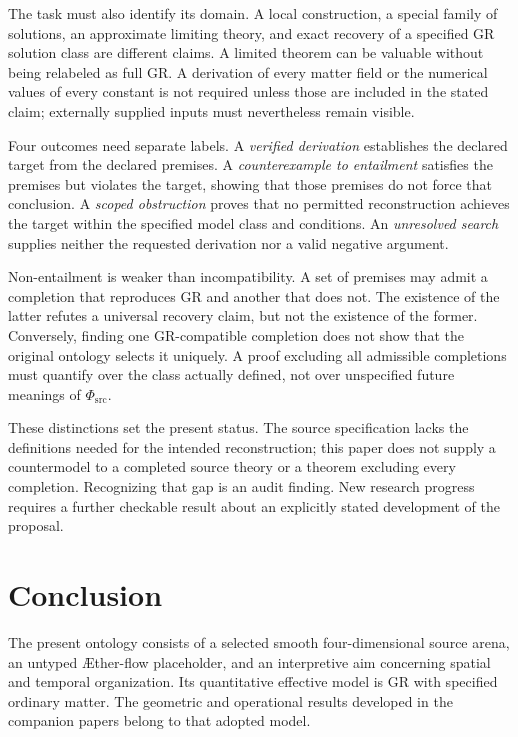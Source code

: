 \documentclass[11pt,oneside]{report}
\newcommand{\Aflow}{\AE{}ther-flow}
\newcommand{\PhiSrc}{\Phi_{\mathrm{src}}}
\theoremstyle{remark}
\numberwithin{definition}{chapter}
\numberwithin{proposition}{chapter}
\numberwithin{remark}{chapter}
\begin{document}
The task must also identify its domain. A local construction, a special family of solutions, an approximate limiting theory, and exact recovery of a specified GR solution class are different claims. A limited theorem can be valuable without being relabeled as full GR. A derivation of every matter field or the numerical values of every constant is not required unless those are included in the stated claim; externally supplied inputs must nevertheless remain visible.

Four outcomes need separate labels. A \emph{verified derivation} establishes the declared target from the declared premises. A \emph{counterexample to entailment} satisfies the premises but violates the target, showing that those premises do not force that conclusion. A \emph{scoped obstruction} proves that no permitted reconstruction achieves the target within the specified model class and conditions. An \emph{unresolved search} supplies neither the requested derivation nor a valid negative argument.

Non-entailment is weaker than incompatibility. A set of premises may admit a completion that reproduces GR and another that does not. The existence of the latter refutes a universal recovery claim, but not the existence of the former. Conversely, finding one GR-compatible completion does not show that the original ontology selects it uniquely. A proof excluding all admissible completions must quantify over the class actually defined, not over unspecified future meanings of $\PhiSrc$.

These distinctions set the present status. The source specification lacks the definitions needed for the intended reconstruction; this paper does not supply a countermodel to a completed source theory or a theorem excluding every completion. Recognizing that gap is an audit finding. New research progress requires a further checkable result about an explicitly stated development of the proposal.

\section{Conclusion}
The present ontology consists of a selected smooth four-dimensional source arena, an untyped \Aflow{} placeholder, and an interpretive aim concerning spatial and temporal organization. Its quantitative effective model is GR with specified ordinary matter. The geometric and operational results developed in the companion papers belong to that adopted model.
\end{document}
